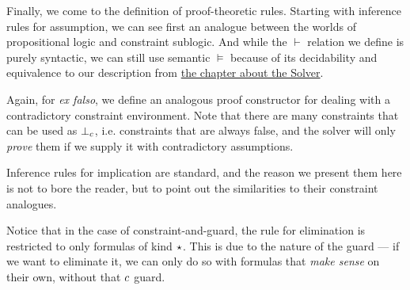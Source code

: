\documentclass[english, mgr]{iithesis}
\renewcommand{\it}[1]{\textit{#1}}
\begin{document}
Finally, we come to the definition of proof-theoretic rules.
Starting with inference rules for assumption,
we can see first an analogue between the worlds of propositional logic
and constraint sublogic.
And while the $\vdash$ relation we define is purely syntactic,
we can still use semantic $\vDash$ because of its decidability and equivalence
to our description from \hyperref[sec:solver]{the chapter about the Solver}.

Again, for \it{ex falso}, we define an analogous proof constructor for dealing with a contradictory
constraint environment.
Note that there are many constraints that can be used as $\bot_c$, i.e.
constraints that are always false, and the solver will only \it{prove} them
if we supply it with contradictory assumptions.

Inference rules for implication are standard, and the reason we present them here
is not to bore the reader, but to point out the similarities to their constraint analogues.

Notice that in the case of constraint-and-guard, the rule for elimination is restricted
to only formulas of kind $\star$.
This is due to the nature of the guard --- if we want to eliminate it,
we can only do so with formulas that \it{make sense} on their own,
without that $c$ guard.
\end{document}
